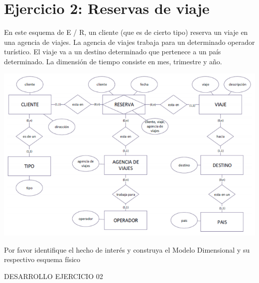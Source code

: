 \section{Ejercicio 2: Reservas de viaje } 

En este esquema de E / R, un cliente (que es de cierto tipo) reserva un viaje en una agencia de viajes. La agencia de viajes
trabaja para un determinado operador turístico. El viaje va a un destino determinado que pertenece a un país determinado.
La dimensión de tiempo consiste en mes, trimestre y año.

	\begin{center}
	\includegraphics[width=17cm]{./Imagenes/2}
	\end{center}	

Por favor identifique el hecho de interés y construya el Modelo Dimensional y su respectivo esquema físico

DESARROLLO 
EJERCICIO 02

